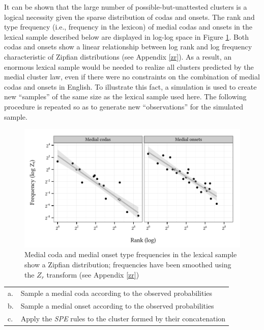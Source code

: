 It can be shown that the large number of possible-but-unattested clusters is a logical necessity given the sparse distribution of codas and onsets.
The rank and type frequency (i.e., frequency in the lexicon) of medial codas and onsets in the lexical sample described below are displayed in log-log space in Figure \ref{cao}.
Both codas and onsets show a linear relationship between log rank and log frequency characteristic of Zipfian distributions (see Appendix \ref{zr}).
As a result, an enormous lexical sample would be needed to realize all clusters predicted by the medial cluster law, even if there were no constraints on the combination of medial codas and onsets in English.
To illustrate this fact, a simulation is used to create new ``samples'' of the same size as the lexical sample used here.
The following procedure is repeated so as to generate new ``observations'' for the simulated sample.

\begin{figure}[t]
\centering
\includegraphics{co.pdf}
\caption{Medial coda and medial onset type frequencies in the lexical sample show a Zipfian distribution; frequencies have been smoothed using the $Z_r$ transform (see Appendix \ref{zr})}
\label{cao}
\end{figure}

\begin{example}
\begin{tabular}{l l}
a. & Sample a medial coda according to the observed probabilities  \\
b. & Sample a medial onset according to the observed probabilities \\
c. & Apply the \emph{SPE} rules to the cluster formed by their concatenation \\
\end{tabular}
\end{example}

